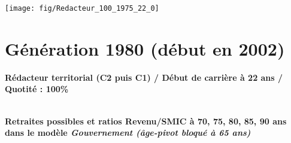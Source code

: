  \vspace{0.1cm} 

 {\hspace{-2.2cm}\texttt{[image: fig/Redacteur\_100\_1975\_22\_0]}} 

\newpage 
 
\section{Génération 1980 (début en 2002)\label{Redacteur_100_1980_22_0}} 
 
{\bf \noindent Rédacteur territorial (C2 puis C1) / Début de carrière à 22 ans / Quotité : 100\%}  ~ 

 ~\\{\bf \noindent Retraites possibles et ratios Revenu/SMIC à 70, 75, 80, 85, 90 ans dans le modèle \emph{Gouvernement (âge-pivot bloqué à 65 ans)}}  
 
